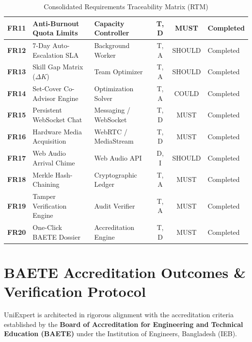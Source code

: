 \documentclass[10.5pt,a4paper]{article}
\begin{document}
\begin{table}[h]
\begin{tabularx}{\linewidth}{|l|l|l|c|c|l|}
\textbf{FR11} & Anti-Burnout Quota Limits & Capacity Controller & T, D & MUST & Completed \\ \hline
\textbf{FR12} & 7-Day Auto-Escalation SLA & Background Worker & T, A & SHOULD & Completed \\ \hline
\textbf{FR13} & Skill Gap Matrix ($\Delta K$) & Team Optimizer & T, A & SHOULD & Completed \\ \hline
\textbf{FR14} & Set-Cover Co-Advisor Engine & Optimization Solver & T, A & COULD & Completed \\ \hline
\textbf{FR15} & Persistent WebSocket Chat & Messaging / WebSocket & T, D & MUST & Completed \\ \hline
\textbf{FR16} & Hardware Media Acquisition & WebRTC / MediaStream & T, D & MUST & Completed \\ \hline
\textbf{FR17} & Web Audio Arrival Chime & Web Audio API & D, I & SHOULD & Completed \\ \hline
\textbf{FR18} & Merkle Hash-Chaining & Cryptographic Ledger & T, A & MUST & Completed \\ \hline
\textbf{FR19} & Tamper Verification Engine & Audit Verifier & T, A & MUST & Completed \\ \hline
\textbf{FR20} & One-Click BAETE Dossier & Accreditation Engine & T, D & MUST & Completed \\ \hline
\end{tabularx}
\caption{Consolidated Requirements Traceability Matrix (RTM)}
\label{tab:rtm}
\end{table}

\clearpage

\section{BAETE Accreditation Outcomes \& Verification Protocol}

UniExpert is architected in rigorous alignment with the accreditation criteria established by the \textbf{Board of Accreditation for Engineering and Technical Education (BAETE)} under the Institution of Engineers, Bangladesh (IEB).
\end{document}
